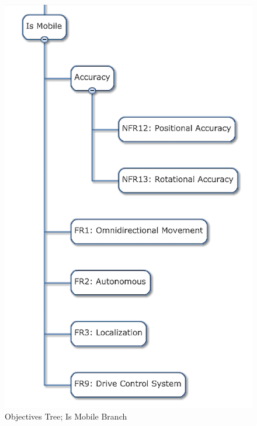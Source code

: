 \begin{figure}[!ht]
\centering
\includegraphics[width=0.98\columnwidth]{figs/objectives_tree/objectives_tree_mobile.png}
\caption{Objectives Tree; Is Mobile Branch}
\label{fig:obj_tree_mobile}
\end{figure}

